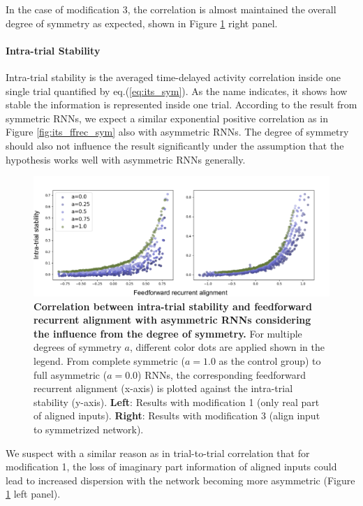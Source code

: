 \documentclass[11pt]{article}
\begin{document}
	In the case of modification 3, the correlation is almost maintained the overall degree of symmetry as expected, shown in Figure \ref{fig:its_asym} right panel. 
	
	\paragraph{Intra-trial Stability}
	
	Intra-trial stability is the averaged time-delayed activity correlation inside one single trial quantified by eq.(\ref{eq:its_sym}). As the name indicates, it shows how stable the information is represented inside one trial. According to the result from symmetric RNNs, we expect a similar exponential positive correlation as in Figure \ref{fig:its_ffrec_sym} also with asymmetric RNNs. The degree of symmetry should also not influence the result significantly under the assumption that the hypothesis works well with asymmetric RNNs generally.
		\begin{figure}[H]
			\centering
			\includegraphics[width=\textwidth]{../figures/its_asym.pdf}
			\caption{\textbf{Correlation between intra-trial stability and feedforward recurrent alignment with asymmetric RNNs considering the influence from the degree of symmetry.} For multiple degrees of symmetry $a$, different color dots are applied shown in the legend. From complete symmetric ($a = 1.0$ as the control group) to full asymmetric ($a = 0.0$) RNNs, the corresponding feedforward recurrent alignment (x-axis) is plotted against the intra-trial stability (y-axis). \textbf{Left}: Results with modification 1 (only real part of aligned inputs). \textbf{Right}: Results with modification 3 (align input to symmetrized network).}
			\label{fig:its_asym}
		\end{figure}
	We suspect with a similar reason as in trial-to-trial correlation that for modification 1, the loss of imaginary part information of aligned inputs could lead to increased dispersion with the network becoming more asymmetric (Figure \ref{fig:its_asym} left panel). 
	
\end{document}
